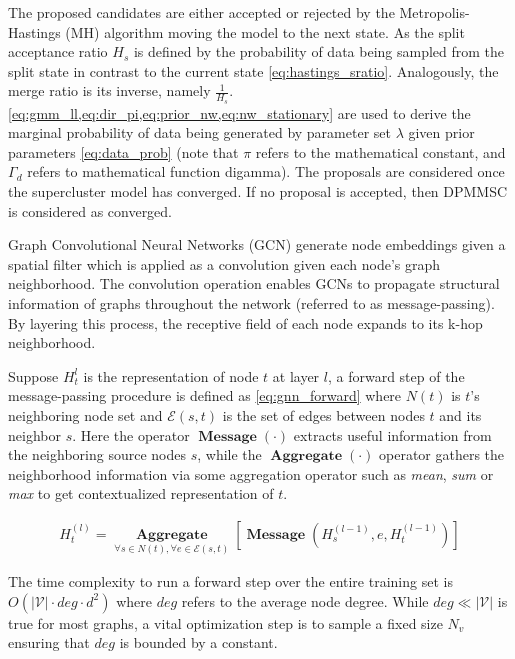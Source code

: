 \begin{secDefinition}
The proposed candidates are either accepted or rejected by the Metropolis-Hastings (MH) algorithm moving the model to the next state.
As the split acceptance ratio $H_s$ is defined by the probability of data being sampled from the split state in contrast to the current state \cref{eq:hastings_sratio}.
Analogously, the merge ratio is its inverse, namely $\frac{1}{H_s}$.
\cref{eq:gmm_ll,eq:dir_pi,eq:prior_nw,eq:nw_stationary} are used to derive the marginal probability of data being generated by parameter set $\lambda$ given prior parameters \cref{eq:data_prob} (note that $\pi$ refers to the mathematical constant, and $\Gamma_d$ refers to mathematical function digamma).
%
The proposals are considered once the supercluster model has converged. If no proposal is accepted, then DPMMSC is considered as converged.
\end{secDefinition}

\begin{secDefinition}
Graph Convolutional Neural Networks (GCN) \cite{kipfSemiSupervisedClassificationGraph2017, hamiltonInductiveRepresentationLearning2017, kazemiRepresentationLearningDynamic2020} generate node embeddings given a spatial filter which is applied as a convolution given each node's graph neighborhood.
The convolution operation enables GCNs to propagate structural information of graphs throughout the network (referred to as message-passing). 
By layering this process, the receptive field of each node expands to its k-hop neighborhood.

Suppose $H_t^l$ is the representation of node $t$ at layer $l$, a forward step of the message-passing procedure is defined as \cref{eq:gnn_forward} where $N(t)$ is $t$'s neighboring node set and $\mathcal{E}(s, t)$ is the set of edges between nodes $t$ and its neighbor $s$. Here the operator $\operatorname{\textbf{Message}}(\cdot)$ extracts useful information from the neighboring source nodes $s$, while the $\operatorname{\textbf{Aggregate}}(\cdot)$ operator gathers the neighborhood information via some aggregation operator such as \textit{mean}, \textit{sum} or \textit{max} to get contextualized representation of $t$.

\begin{align}
    H_t^{(l)} = \underset{\forall s \in N(t), \forall e \in \mathcal{E}(s, t)}{\operatorname{\textbf{Aggregate}}} \left[\operatorname{\textbf{Message}}\left( H_s^{(l-1)}, e, H_t^{(l-1)} \right) \right] \label{eq:gnn_forward}
\end{align}

The time complexity to run a forward step over the entire training set is $O(|\mathcal{V}| \cdot deg \cdot d^2)$ where $deg$ refers to the average node degree.
While $deg \ll |\mathcal{V}|$ is true for most graphs, a vital optimization step is to sample a fixed size $N_v$ ensuring that $deg$ is bounded by a constant.
\end{secDefinition}


